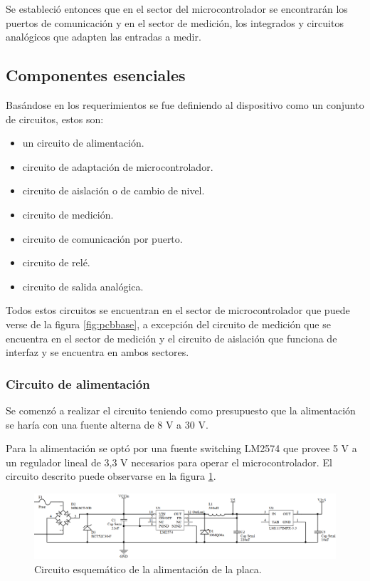 Se estableció entonces que en el sector del microcontrolador se encontrarán los puertos de comunicación y en el sector de medición, los integrados y circuitos analógicos que adapten las entradas a medir.

\subsection{Componentes esenciales}

Basándose en los requerimientos se fue definiendo al dispositivo como  un conjunto de circuitos, estos son:

\begin{itemize}
\item un circuito de alimentación.
\item circuito de adaptación de microcontrolador.
\item circuito de aislación o de cambio de nivel.
\item circuito de medición.
\item circuito de comunicación por puerto.
\item circuito de relé.
\item circuito de salida analógica.
\end{itemize}

Todos estos circuitos se encuentran en el sector de microcontrolador que puede verse de la figura \ref{fig:pcbbase}, a excepción del circuito de  medición que se encuentra en el sector de medición  y el circuito de aislación que funciona de interfaz y se encuentra en ambos sectores.

\subsubsection{Circuito de alimentación}
Se comenzó a realizar el circuito teniendo como presupuesto que la alimentación se haría con una fuente alterna de 8 V a 30 V.

Para la alimentación se optó por una fuente switching  LM2574 que provee 5 V a un regulador lineal de 3,3 V necesarios para operar el microcontrolador. El circuito descrito puede observarse en la figura \ref{fig:circalim1}.

\begin{figure}[!htb]
	\centering
	\includegraphics[width=120mm,keepaspectratio]{Figures/alimentacion1.png}
	\caption{Circuito esquemático de la alimentación de la placa.}
	\label{fig:circalim1}
\end{figure}

